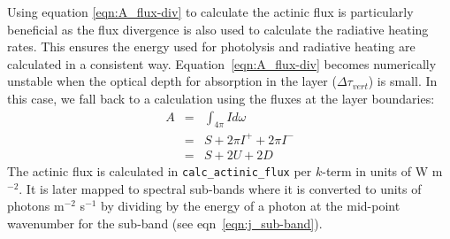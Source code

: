 Using equation \ref{eqn:A_flux-div} to calculate the actinic flux is particularly beneficial as the flux divergence is also used to calculate the radiative heating rates. This ensures the energy used for photolysis and radiative heating are calculated in a consistent way. Equation~\ref{eqn:A_flux-div} becomes numerically unstable when the optical depth for absorption in the layer ($\Delta \tau_{vert}$) is small. In this case, we fall back to a calculation using the fluxes at the layer boundaries:
\begin{eqnarray}
A & = & \int_{4\pi}I d\omega \nonumber \\
  & = & S + 2 \pi I^+ + 2 \pi I^- \nonumber \\
  & = & S + 2 U + 2 D
\end{eqnarray}
The actinic flux is calculated in {\tt calc\_actinic\_flux} per $k$-term in units of W m$^{-2}$. It is later mapped to spectral sub-bands where it is converted
to units of photons m$^{-2}$ s$^{-1}$ by dividing by the energy of a photon at the mid-point wavenumber for the sub-band (see eqn~\ref{eqn:j_sub-band}).

